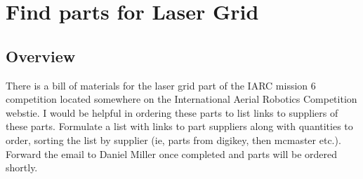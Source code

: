 \documentclass[12pt,letterpaper]{article}
\begin{document}
\section{Find parts for Laser Grid}
\subsection{Overview}
There is a bill of materials for the laser grid part of the IARC mission 6
competition located somewhere on the International Aerial Robotics Competition
webstie. I would be helpful in ordering these parts to list links to suppliers
of these parts. Formulate a list with links to part suppliers along with
quantities to order, sorting the list by supplier (ie, parts from digikey, then
mcmaster etc.).\\
Forward the email to Daniel Miller once completed and parts will be ordered
shortly.
\end{document}
